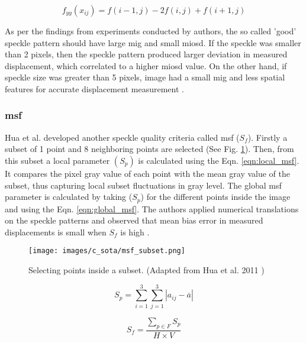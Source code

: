         \begin{equation}
            f_{yy}(x_{ij}) = f(i-1,j) - 2f(i,j) + f(i+1,j)
        \end{equation}

        \noindent As per the findings from experiments conducted by authors, the so called 'good' speckle pattern should have large \gls{mig} and small \gls{miosd}. If the speckle was smaller than 2 pixels, then the speckle pattern produced larger deviation in measured displacement, which correlated to a higher \gls{miosd} value. On the other hand, if speckle size was greater than 5 pixels, image had a small \gls{mig} and less spatial features for accurate displacement measurement \cite{yu_miosd}.

    \subsubsection{\gls{msf}}
        Hua et al. developed another speckle quality criteria called \gls{msf} ($S_f$). Firstly a subset of 1 point and 8 neighboring points are selected (See Fig. \ref{fig:msf_subset.png}). Then, from this subset a local parameter $(S_p)$ is calculated using the Eqn. \ref{eqn:local_msf}. It compares the pixel gray value of each point with the mean gray value of the subset, thus capturing local subset fluctuations in gray level. The global \gls{msf} parameter is calculated by taking ($S_p$) for the different points inside the image and using the Eqn. \ref{eqn:global_msf}. The authors applied numerical translations on the speckle patterns and observed that mean bias error in measured displacements is small when $S_f$ is high \cite{hua_msf}.

        \begin{figure}[h]
            \centering
            \texttt{[image: images/c\_sota/msf\_subset.png]}
            \caption{Selecting points inside a subset. (Adapted from Hua et al. 2011 \cite{hua_msf})}
            \label{fig:msf_subset.png}
        \end{figure}        
        
        \begin{equation}
            S_p = \sum_{i=1}^{3} \sum_{j=1}^{3} |a_{ij} - \overline{a}|
            \label{eqn:local_msf}
        \end{equation}

        \begin{equation}
            S_f = \dfrac{\sum_{p \in F} S_p}{H \times V}
            \label{eqn:global_msf}
        \end{equation}
    
